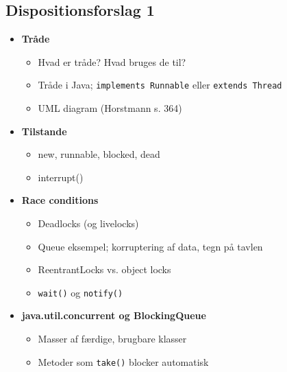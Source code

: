 \subsection{Dispositionsforslag 1}

\begin{itemize}
    \item \textbf{Tråde}
    \begin{itemize}
        \item Hvad er tråde? Hvad bruges de til?
        \item Tråde i Java; \verb|implements Runnable| eller \verb|extends Thread|
        \item UML diagram (Horstmann s. 364)
    \end{itemize}
    
    \item \textbf{Tilstande}
    \begin{itemize}
        \item new, runnable, blocked, dead
        \item interrupt()
    \end{itemize}

    \item \textbf{Race conditions}
    \begin{itemize}
        \item Deadlocks (og livelocks)
        \item Queue eksempel; korruptering af data, tegn på tavlen
        \item ReentrantLocks vs. object locks
        \item \verb|wait()| og \verb|notify()|
    \end{itemize}

    \item \textbf{java.util.concurrent og BlockingQueue}
    \begin{itemize}
        \item Masser af færdige, brugbare klasser
        \item Metoder som \verb|take()| blocker automatisk
    \end{itemize}
\end{itemize}
